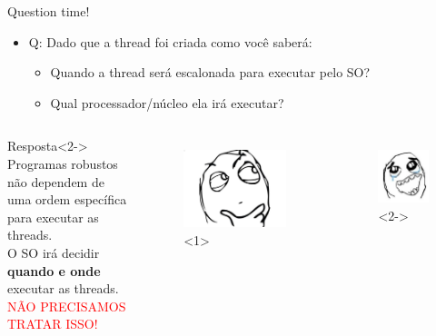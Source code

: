 \documentclass[10pt, xcolor=x11names]{beamer}
\begin{document}

\begin{frame}
	\begin{alertblock}{Question time!}

		\begin{itemize}
			\item Q: Dado que a thread foi criada como você saberá:
				\begin{itemize}
					\item Quando a thread será escalonada para executar pelo SO?
					\item Qual processador/núcleo ela irá executar?	
				\end{itemize}
		\end{itemize}
	\end{alertblock}

	\begin{columns}	
			\begin{block}{Resposta}<2->
				Programas robustos não dependem de uma ordem específica para executar as threads. \\
				O SO irá decidir \textbf{quando e onde} executar as threads. \\
				\textcolor{red}{NÃO PRECISAMOS TRATAR ISSO!}				
			\end{block}

			\begin{figure}
				\includegraphics[width=.55\linewidth]{img/question-meme.jpg}<1>
			\end{figure}	
			\begin{figure}
				\includegraphics[width=.55\linewidth]{img/question-answer.jpg}<2->
			\end{figure}
 			
	\end{columns}
\end{frame}
\end{document}
